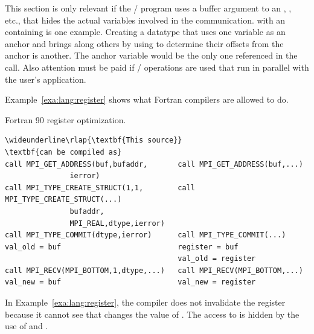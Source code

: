 This section is only relevant if the \MPI/ program uses
a buffer argument to an , ,
etc., that hides the actual
variables involved in the communication.
 with an
 containing  is one example.  Creating
a datatype that uses one variable as an anchor and brings along
others by using  to determine their offsets from
the anchor is another. The anchor variable would be the only one
referenced in the call. Also attention must be paid if \MPI/ operations
are used that run in parallel with the user's application.

Example~\ref{exa:lang:register}
shows what Fortran compilers are allowed to do.

\begin{example}
Fortran 90 register optimization.
\label{exa:lang:register}
%
%

\begin{Verbatim}[commandchars=\\\{\}]
\wideunderline\rlap{\textbf{This source}}                                        \textbf{can be compiled as}
call MPI_GET_ADDRESS(buf,bufaddr,       call MPI_GET_ADDRESS(buf,...)
               ierror)
call MPI_TYPE_CREATE_STRUCT(1,1,        call MPI_TYPE_CREATE_STRUCT(...)
               bufaddr,
               MPI_REAL,dtype,ierror)
call MPI_TYPE_COMMIT(dtype,ierror)      call MPI_TYPE_COMMIT(...)
val_old = buf                           register = buf
                                        val_old = register
call MPI_RECV(MPI_BOTTOM,1,dtype,...)   call MPI_RECV(MPI_BOTTOM,...)
val_new = buf                           val_new = register
\end{Verbatim}
\lstset{fancyvrb=false}
\end{example}

In Example~\ref{exa:lang:register}, the
compiler does not invalidate the register because it cannot
see that  changes the value of .
The access to  is hidden by the use of
 and .

